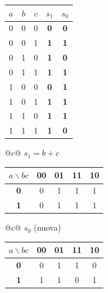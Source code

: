 \documentclass[12pt, a4paper]{article}
\begin{document}
\begin{center}
\renewcommand{\arraystretch}{1.25}
\begin{tabular}[t]{|ccc||cc|}
\hline
\colorbox{gray!25}{\color{black}$a$} & \colorbox{gray!25}{\color{black}$b$} & \colorbox{gray!25}{\color{black}$c$} & \colorbox{gray!25}{\color{black}$s_1$} & \colorbox{gray!25}{\color{black}$s_0$} \\ \hline
0 & 0 & 0 & \textbf{0} & \textbf{0} \\ \hline
0 & 0 & 1 & \textbf{1} & \textbf{1} \\ \hline
0 & 1 & 0 & \textbf{1} & \textbf{0} \\ \hline
0 & 1 & 1 & \textbf{1} & \textbf{1} \\ \hline
1 & 0 & 0 & \textbf{0} & \textbf{1} \\ \hline
1 & 0 & 1 & \textbf{1} & \textbf{1} \\ \hline
1 & 1 & 0 & \textbf{1} & \textbf{1} \\ \hline
1 & 1 & 1 & \textbf{1} & \textbf{0} \\ \hline
\end{tabular}
\end{center}
\begin{center}
\renewcommand{\arraystretch}{1.25}
\begin{tabular}[t]{@{}c@{}}
$s_1 = b + c$\\[3pt]
\begin{tabular}[t]{|c|c|c|c|c|}
\hline
\colorbox{gray!25}{\color{black}$a\backslash bc$} & \colorbox{gray!25}{\color{black}\textbf{00}} & \colorbox{gray!25}{\color{black}\textbf{01}} & \colorbox{gray!25}{\color{black}\textbf{11}} & \colorbox{gray!25}{\color{black}\textbf{10}} \\ \hline
\colorbox{gray!25}{\color{black}\textbf{0}} & 0 & 1 & 1 & 1 \\ \hline
\colorbox{gray!25}{\color{black}\textbf{1}} & 0 & 1 & 1 & 1 \\ \hline
\end{tabular}
\end{tabular}
\qquad
\begin{tabular}[t]{@{}c@{}}
$s_0$ (nuova)\\[3pt]
\begin{tabular}[t]{|c|c|c|c|c|}
\hline
\colorbox{gray!25}{\color{black}$a\backslash bc$} & \colorbox{gray!25}{\color{black}\textbf{00}} & \colorbox{gray!25}{\color{black}\textbf{01}} & \colorbox{gray!25}{\color{black}\textbf{11}} & \colorbox{gray!25}{\color{black}\textbf{10}} \\ \hline
\colorbox{gray!25}{\color{black}\textbf{0}} & 0 & 1 & 1 & 0 \\ \hline
\colorbox{gray!25}{\color{black}\textbf{1}} & 1 & 1 & 0 & 1 \\ \hline
\end{tabular}
\end{tabular}
\end{center}
\end{document}
